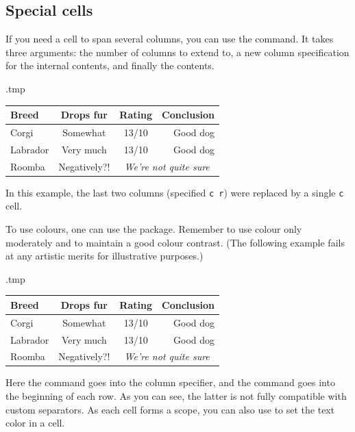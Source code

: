 %
%
\subsection{Special cells}

If you need a cell to span several columns,
you can use the  command.
It takes three arguments: the number of columns to extend to,
a new column specification for the internal contents, and finally the contents.\label{ex:extrarowheight}
%
\begin{VerbatimOut}{\jobname.tmp}
\setlength\extrarowheight{2pt}
\centering
\begin{tabular}{l| c c @{ $\Rightarrow$ } r}
Breed & Drops fur & Rating & Conclusion\\
\hline
Corgi & Somewhat & 13/10 & Good dog\\
Labrador & Very much & 13/10 & Good dog\\
Roomba & Negatively?! &
    \multicolumn{2}{c}{\emph{We're not quite sure}}
\end{tabular}
\end{VerbatimOut}
\ShowExampleBelow
%
In this example, the last two columns (specified \verb|c r|)
were replaced by a single \verb|c| cell.

To use colours, one can use the  package.
Remember to use colour only moderately and to maintain a good colour contrast.
(The following example fails at any artistic merits for illustrative purposes.)
%
\begin{VerbatimOut}{\jobname.tmp}
\centering
\begin{tabular}{>{\columncolor{green!15}}l | c c @{ $\Rightarrow$ } r}
\rowcolor{blue!15} Breed & Drops fur & Rating & Conclusion\\
\hline
Corgi & Somewhat & 13/10 & Good dog\\
Labrador & Very much & 13/10 & Good dog\\
Roomba & \cellcolor{orange!20} Negatively?! &
    \multicolumn{2}{c}{\emph{We're not quite sure}}
\end{tabular}
\end{VerbatimOut}
\ShowExampleBelow
%
Here the  command goes into the column specifier, and
the  command goes into the beginning of each row.
As you can see, the latter is not fully compatible with custom separators.
As each cell forms a scope, you can also use  to set the text color in a cell.


